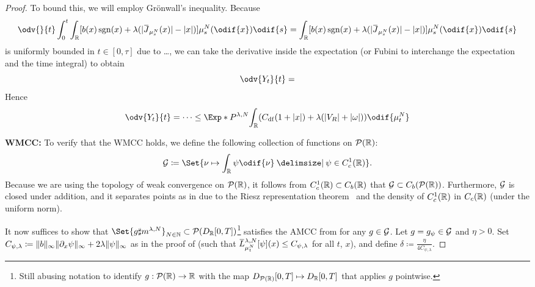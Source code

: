 \begin{proof}
  To bound this, we will employ Grönwall's inequality.
  Because
  \begin{equation}
    \odv{}{t} \int_0^t \int_\potspace \sbr{ b(x) \sgn(x) + \lambda (\abs{\ol{J}_{\mu_{s}^N}(x)} - \abs{x}) } \mu_{s}^N(\odif{x}) \odif{s} = \int_\potspace \sbr{ b(x) \sgn(x) + \lambda (\abs{\ol{J}_{\mu_{s}^N}(x)} - \abs{x}) } \mu_{s}^N(\odif{x}) \odif{s}
  \end{equation}
  is uniformly bounded in \( t \in [0,\tau] \) due to \dots, we can take the derivative inside the expectation (or Fubini to interchange the expectation and the time integral) to obtain
  \begin{equation}
    \odv{Y_t}{t} = %
  \end{equation}
  Hence
  \begin{equation}
    \odv{Y_t}{t} = \dots
    \leq \Exp*{P^{\lambda, N}}{ \int_\potspace \br{ C_\mathrm{df} (1 + \abs{x}) + \lambda (\abs{V_R} + \abs{\omega}) } \odif{\mu_{t}^N} }
  \end{equation}

  \bigskip

  \textbf{WMCC:}
  To verify that the WMCC holds, we define the following collection of functions on \(\mathcal{P}(\mathbb{R})\):
  \begin{equation}
    \cG \coloneqq \Set{\nu \mapsto \int_\potspace \psi \odif{\nu} \given \psi \in C_c^1(\potspace)}.
  \end{equation}
  Because we are using the topology of weak convergence on \(\mathcal{P}(\mathbb{R})\), it follows from \(C_c^1(\mathbb{R}) \subset C_b(\mathbb{R})\) that \(\mathcal{G} \subset C_b(\mathcal{P}(\mathbb{R}))\).
  Furthermore, \( \mathcal{G} \) is closed under addition, and it separates points as in  due to the Riesz representation theorem~\cite[Thm. 2.14]{rudinRealComplexAnalysis2013} and the density of \( C_c^1(\mathbb{R}) \) in \( C_c(\mathbb{R}) \) (under the uniform norm).

  It now suffices to show that \( \Set{g \sharp \lawmu^{\lambda, N}}_{N\in\bN} \subset \cP(D_{\potspace}[0,T])\)\footnote{Still abusing notation to identify \( g : \mathcal{P}(\mathbb{R}) \to \mathbb{R} \) with the map \( D_{\mathcal{P}(\mathbb{R})}[0,T] \mapsto D_{\mathbb{R}}[0,T] \) that applies \( g \) pointwise.} satisfies the AMCC from  for any \( g \in \mathcal{G} \).
  Let \( g = g_\psi \in \mathcal{G} \) and \( \eta > 0 \).
  Set \( C_{\psi, \lambda} \coloneqq \lVert b\rVert_\infty \lVert\partial_x \psi\rVert_\infty + 2\lambda \lVert\psi\rVert_\infty \) as in the proof of  (such that \( \ol{L}_{\mu_t^N}^{\lambda,N} [\psi] (x) \leq C_{\psi, \lambda} \) for all \( t \), \( x \)), and define \(\delta \coloneqq \frac{\eta}{4C_{\psi, \lambda}}\).


\end{proof}
